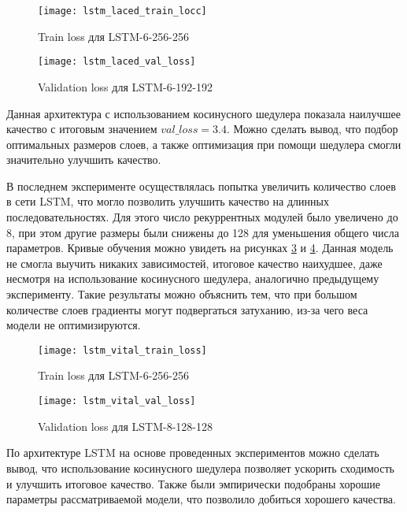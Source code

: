 \begin{figure}[ht]
	\centering
	\texttt{[image: lstm\_laced\_train\_locc]}  
	\caption{ Train loss для LSTM-6-256-256 }
	\label{fig:lstm_6_192_192_train}
\end{figure}

\begin{figure}[ht]
	\centering
	\texttt{[image: lstm\_laced\_val\_loss]}  
	\caption{ Validation loss для LSTM-6-192-192 }
	\label{fig:lstm_6_192_192_val}
\end{figure}

Данная архитектура с использованием косинусного шедулера показала наилучшее качество с итоговым значением $val\_loss = 3.4$. Можно сделать вывод, что подбор оптимальных размеров слоев, а также оптимизация при помощи шедулера смогли значительно улучшить качество.

В последнем эксперименте осуществлялась попытка увеличить количество слоев в сети LSTM, что могло позволить улучшить качество на длинных последовательностях. Для этого число рекуррентных модулей было увеличено до 8, при этом другие размеры были снижены до 128 для уменьшения общего числа параметров. Кривые обучения можно увидеть на рисунках \ref{fig:lstm_8_128_128_train} и \ref{fig:lstm_8_128_128_val}. Данная модель не смогла выучить никаких зависимостей, итоговое качество наихудшее, даже несмотря на использование косинусного шедулера, аналогично предыдущему эксперименту. Такие результаты можно объяснить тем, что при большом количестве слоев градиенты могут подвергаться затуханию, из-за чего веса модели не оптимизируются.

\begin{figure}[ht]
	\centering
	\texttt{[image: lstm\_vital\_train\_loss]}  
	\caption{ Train loss для LSTM-6-256-256 }
	\label{fig:lstm_8_128_128_train}
\end{figure}

\begin{figure}[ht]
	\centering
	\texttt{[image: lstm\_vital\_val\_loss]}  
	\caption{ Validation loss для LSTM-8-128-128 }
	\label{fig:lstm_8_128_128_val}
\end{figure}

По архитектуре LSTM на основе проведенных экспериментов можно сделать вывод, что использование косинусного шедулера позволяет ускорить сходимость и улучшить итоговое качество. Также были эмпирически подобраны хорошие параметры рассматриваемой модели, что позволило добиться хорошего качества.

